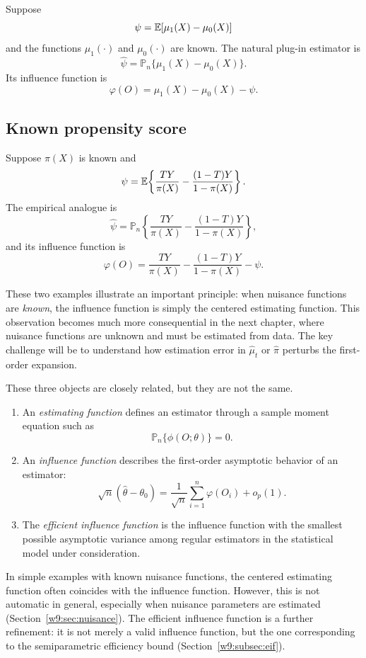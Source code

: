 \documentclass[master.tex]{subfiles}
\begin{document}
Suppose
\[
  \psi = \mathbb{E}[\mu_1(X) - \mu_0(X)]
\]
and the functions $\mu_1(\cdot)$ and $\mu_0(\cdot)$ are known.  The
natural plug-in estimator is
\[
  \hat\psi = \mathbb{P}_n\{\mu_1(X) - \mu_0(X)\}.
\]
Its influence function is
\[
  \varphi(O) = \mu_1(X) - \mu_0(X) - \psi.
\]

\subsection{Known propensity score}
\label{w9:subsec:if-ipw}

Suppose $\pi(X)$ is known and
\[
  \psi = \mathbb{E}\!\left\{\frac{TY}{\pi(X)} - \frac{(1-T)Y}{1-\pi(X)}\right\}.
\]
The empirical analogue is
\[
  \hat\psi
  =
  \mathbb{P}_n\!\left\{\frac{TY}{\pi(X)} - \frac{(1-T)Y}{1-\pi(X)}\right\},
\]
and its influence function is
\[
  \varphi(O)
  =
  \frac{TY}{\pi(X)} - \frac{(1-T)Y}{1-\pi(X)} - \psi.
\]

\begin{remark}
\label{w9:rem:if-principle}
These two examples illustrate an important principle: when nuisance
functions are \emph{known}, the influence function is simply the
centered estimating function.  This observation becomes much more
consequential in the next chapter, where nuisance functions are
unknown and must be estimated from data.  The key challenge will be to
understand how estimation error in $\hat\mu_t$ or $\hat\pi$ perturbs
the first-order expansion.
\end{remark}

\begin{remark}
\label{w9:rem:three-objects}
These three objects are closely related, but they are not the same.

\begin{enumerate}
  \item An \emph{estimating function} defines an estimator through a
    sample moment equation such as
    \[
      \mathbb{P}_n\{\phi(O;\theta)\} = 0.
    \]

  \item An \emph{influence function} describes the first-order
    asymptotic behavior of an estimator:
    \[
      \sqrt{n}(\hat\theta - \theta_0)
      =
      \frac{1}{\sqrt{n}}\sum_{i=1}^n \varphi(O_i) + o_p(1).
    \]

  \item The \emph{efficient influence function} is the influence
    function with the smallest possible asymptotic variance among
    regular estimators in the statistical model under consideration.
\end{enumerate}

In simple examples with known nuisance functions, the centered
estimating function often coincides with the influence function.
However, this is not automatic in general, especially when nuisance
parameters are estimated (Section~\ref{w9:sec:nuisance}).  The
efficient influence function is a further refinement: it is not merely
a valid influence function, but the one corresponding to the
semiparametric efficiency bound (Section~\ref{w9:subsec:eif}).
\end{remark}
\end{document}
